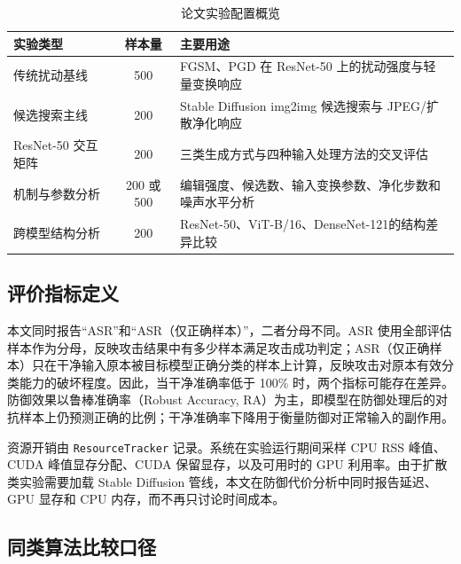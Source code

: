 \documentclass[type=bachelor,oneside]{fduthesis}
\newcommand{\tablefont}{\small}
\begin{document}
\begin{table}[htbp]
  \centering
  \caption{论文实验配置概览}
  \label{tab:exp_config_overview}
  \tablefont
  \setlength{\tabcolsep}{3pt}
  \begin{tabularx}{\textwidth}{lcX}
    \toprule
    实验类型 & 样本量 & 主要用途 \\
    \midrule
    传统扰动基线 & 500 & FGSM、PGD 在 ResNet-50 上的扰动强度与轻量变换响应 \\
    候选搜索主线 & 200 & Stable Diffusion img2img 候选搜索与 JPEG/扩散净化响应 \\
    ResNet-50 交互矩阵 & 200 & 三类生成方式与四种输入处理方法的交叉评估 \\
    机制与参数分析 & 200 或 500 & 编辑强度、候选数、输入变换参数、净化步数和噪声水平分析 \\
    跨模型结构分析 & 200 & ResNet-50、ViT-B/16、DenseNet-121的结构差异比较 \\
    \bottomrule
  \end{tabularx}
\end{table}

\subsection{评价指标定义}

本文同时报告“ASR”和“ASR（仅正确样本）”，二者分母不同。ASR 使用全部评估样本作为分母，反映攻击结果中有多少样本满足攻击成功判定；ASR（仅正确样本）只在干净输入原本被目标模型正确分类的样本上计算，反映攻击对原本有效分类能力的破坏程度。因此，当干净准确率低于 100\% 时，两个指标可能存在差异。防御效果以鲁棒准确率（Robust Accuracy, RA）为主，即模型在防御处理后的对抗样本上仍预测正确的比例；干净准确率下降用于衡量防御对正常输入的副作用。

资源开销由 \texttt{ResourceTracker} 记录。系统在实验运行期间采样 CPU RSS 峰值、CUDA 峰值显存分配、CUDA 保留显存，以及可用时的 GPU 利用率。由于扩散类实验需要加载 Stable Diffusion 管线，本文在防御代价分析中同时报告延迟、GPU 显存和 CPU 内存，而不再只讨论时间成本。

\subsection{同类算法比较口径}
\end{document}
